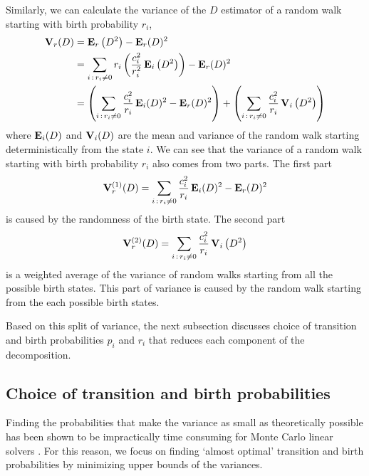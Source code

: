 \documentclass{elsart}
\theoremstyle{remark}
\theoremstyle{definition}
\theoremstyle{proof}
\begin{document}
        Similarly, we can calculate the variance of the $D$ estimator of a
        random walk starting with birth probability $r_i$,
        \begin{equation} \label{splitbirth} \begin{split}
            {\bf V}_r(D)
            &= {\bf E}_r\left(D^2\right) - {\bf E}_r(D)^2 \\
            &= \sum_{i\,:\,r_i\ne0} r_i\left(\frac{c_i^2}{r_i^2}\,
               {\bf E}_i\left(D^2\right)\right) - {\bf E}_r(D)^2 \\
            &= \left(\sum_{i\,:\,r_i\ne0} \frac{c_i^2}{r_i}\,
                     {\bf E}_i(D)^2 - {\bf E}_r(D)^2\right)
               + \left( \sum_{i\,:\,r_i\ne0} \frac{c_i^2}{r_i}\,
                       {\bf V}_i\left(D^2\right) \right)
        \end{split} \end{equation}
        where ${\bf E}_i(D)$ and ${\bf V}_i(D)$ are the mean and variance
        of the random walk starting deterministically from the state $i$.
        We can see that the variance of a random walk starting with birth
        probability $r_i$ also comes from two parts. The first part
        \begin{equation} \label{part1birth}
            {\bf V}_r^{(1)}(D) = 
            \sum_{i\,:\,r_i\ne0} \frac{c_i^2}{r_i}\, {\bf E}_i(D)^2
             - {\bf E}_r(D)^2
        \end{equation}
        is caused by the randomness of the birth state.  The second part
        \begin{equation} \label{part2birth}
            {\bf V}_r^{(2)}(D) = 
            \sum_{i\,:\,r_i\ne0} \frac{c_i^2}{r_i}\, {\bf V}_i\left(D^2\right)
        \end{equation}
        is a weighted average of the variance of random walks starting from
        all the possible birth states.  This part of variance is caused by
        the random walk starting from the each possible birth states.
        
        Based on this split of variance, the next subsection discusses
        choice of transition and birth probabilities $p_i$ and $r_i$ that
        reduces each component of the decomposition.
    


    \subsection{Choice of transition and birth probabilities}
        Finding the probabilities that make the variance as small as
        theoretically possible has been shown to be impractically time
        consuming for Monte Carlo linear solvers \cite{Dimov1991}
        \cite{Dimov1993}.
        For this reason, we focus on finding `almost optimal' transition
        and birth probabilities by minimizing upper bounds of the variances.
\end{document}
